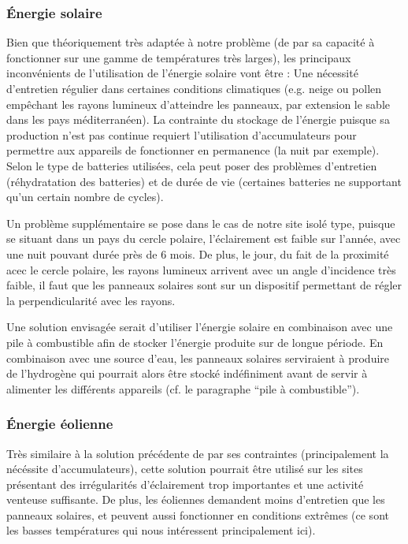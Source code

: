 \subsubsection{Énergie solaire}

Bien que théoriquement très adaptée à notre problème (de par sa capacité à fonctionner sur une gamme de températures très larges), les principaux inconvénients de l’utilisation de l’énergie solaire vont être :
Une nécessité d’entretien régulier dans certaines conditions climatiques (e.g. neige ou pollen empêchant les rayons lumineux d’atteindre les panneaux, par extension le sable dans les pays méditerranéen).
La contrainte du stockage de l’énergie puisque sa production n’est pas continue requiert l’utilisation d’accumulateurs pour permettre aux appareils de fonctionner en permanence (la nuit par exemple). Selon le type de batteries utilisées, cela peut poser des problèmes d’entretien (réhydratation des batteries) et de durée de vie (certaines batteries ne supportant qu’un certain nombre de cycles).

Un problème supplémentaire se pose dans le cas de notre site isolé type, puisque se situant dans un pays du cercle polaire, l’éclairement est faible sur l'année, avec une nuit pouvant durée près de 6 mois. De plus, le jour, du fait de la proximité acec le cercle polaire, les rayons lumineux arrivent avec un angle d'incidence très faible, il faut que les panneaux solaires sont sur un dispositif permettant de régler la perpendicularité avec les rayons.

Une solution envisagée serait d’utiliser l’énergie solaire en combinaison avec une pile à combustible afin de stocker l’énergie produite sur de longue période. En combinaison avec une source d’eau, les panneaux solaires serviraient à produire de l’hydrogène qui pourrait alors être stocké indéfiniment avant de servir à alimenter les différents appareils (cf. le paragraphe “pile à combustible”).

\subsubsection{Énergie éolienne}

Très similaire à la solution précédente de par ses contraintes (principalement la nécéssite d’accumulateurs), cette solution pourrait être utilisé sur les sites présentant des irrégularités d’éclairement trop importantes et une activité venteuse suffisante. De plus, les éoliennes demandent moins d’entretien que les panneaux solaires, et peuvent aussi fonctionner en conditions extrêmes (ce sont les basses températures qui nous intéressent principalement ici).

